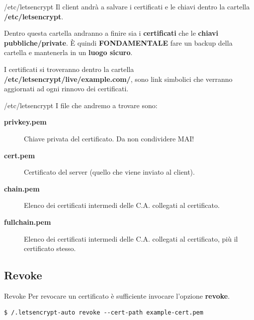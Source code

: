 \documentclass[xcolor=svgnames,11pt]{beamer}
\begin{document}
\begin{frame}{/etc/letsencrypt}
Il client andrà a salvare i certificati e le chiavi dentro la cartella \textbf{/etc/letsencrypt}.

\medskip\pause
{
\begin{block}{}
Dentro questa cartella andranno a finire sia i \textbf{certificati} che le \textbf{chiavi pubbliche/private}.
È quindi \textbf{FONDAMENTALE} fare un backup della cartella e mantenerla in un \textbf{luogo sicuro}.
\end{block}
}
I certificati si troveranno dentro la cartella \textbf{/etc/letsencrypt/live/example.com/}, sono link
simbolici che verranno aggiornati ad ogni rinnovo dei certificati.
\end{frame}

\begin{frame}{/etc/letsencrypt}
I file che andremo a trovare sono:
\begin{description}
  \item[\textbf{privkey.pem}] Chiave privata del certificato. Da non condividere MAI!
  \item[\textbf{cert.pem}] Certificato del server (quello che viene inviato al client).
  \item[\textbf{chain.pem}] Elenco dei certificati intermedi delle C.A. collegati al certificato.
  \item[\textbf{fullchain.pem}] Elenco dei certificati intermedi delle C.A. collegati al certificato, più il certificato stesso.
\end{description}
\end{frame}

\subsection{Revoke}
\begin{frame}[fragile]{Revoke}
Per revocare un certificato è sufficiente invocare l'opzione \textbf{revoke}.

\medskip\pause

\begin{scriptsize}
\begin{verbatim}
$ /.letsencrypt-auto revoke --cert-path example-cert.pem
\end{verbatim}
\end{scriptsize}
\end{frame}
\end{document}
